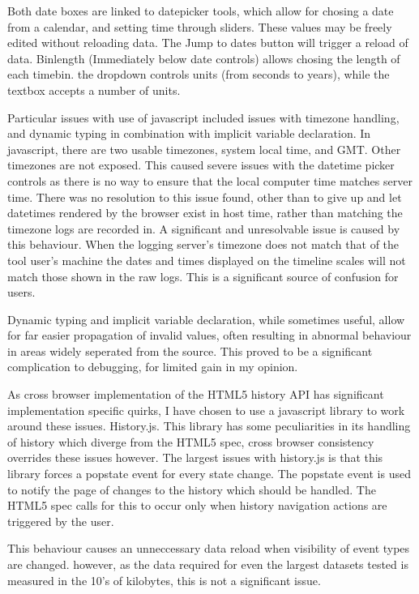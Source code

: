 Both date boxes are linked to datepicker tools, which allow for chosing a date from a calendar, and setting time through sliders. These values may be freely edited without reloading data. The Jump to dates button will trigger a reload of data. 
Binlength (Immediately below date controls) allows chosing the length of each timebin. the dropdown controls units (from seconds to years), while the textbox accepts a number of units.

Particular issues with use of javascript included issues with timezone handling, and dynamic typing in combination with implicit variable declaration. In javascript, there are two usable timezones, system local time, and GMT. Other timezones are not exposed. This caused severe issues with the datetime picker controls as there is no way to ensure that the local computer time matches server time. There was no resolution to this issue found, other than to give up and let datetimes rendered by the browser exist in host time, rather than matching the timezone logs are recorded in. A significant and unresolvable issue is caused by this behaviour. When the logging server's timezone does not match that of the tool user's machine the dates and times displayed on the timeline scales will not match those shown in the raw logs. This is a significant source of confusion for users.

Dynamic typing and implicit variable declaration, while sometimes useful, allow for far easier propagation of invalid values, often resulting in abnormal behaviour in areas widely seperated from the source. This proved to be a significant complication to debugging, for limited gain in my opinion. 

As cross browser implementation of the HTML5 history API has significant implementation specific quirks, I have chosen to use a javascript library to work around these issues. History.js. This library has some peculiarities in its handling of history which diverge from the HTML5 spec, cross browser consistency overrides these issues however.  The largest issues with history.js is that this library forces a popstate event for every state change. The popstate event is used to notify the page of changes to the history which should be handled. The HTML5 spec calls for this to occur only when history navigation actions are triggered by the user.

This behaviour causes an unneccessary data reload when visibility of event types are changed. however, as the data required for even the largest datasets tested is measured in the 10's of kilobytes, this is not a significant issue. 

